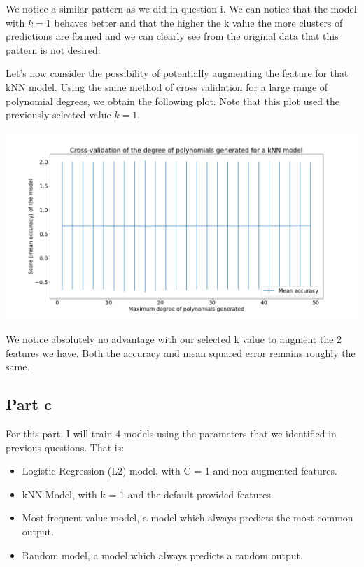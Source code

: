 \documentclass[10pt]{article}
\begin{document}
We notice a similar pattern as we did in question i.
We can notice that the model with $ k = 1 $ behaves better and that the
higher the k value the more clusters of predictions are formed and we can clearly
see from the original data that this pattern is not desired.
\par
Let's now consider the possibility of potentially augmenting the feature for that kNN model.
Using the same method of cross validation for a large range of polynomial degrees, we obtain the following plot.
Note that this plot used the previously selected value $ k = 1 $.

\begin{center}
    \includegraphics[scale=0.25]{ds_2_knn_d_cv.png}
\end{center}
\vspace{5mm} %
We notice absolutely no advantage with our selected k value to augment the 2 features we have.
Both the accuracy and mean squared error remains roughly the same.

\subsection*{Part c}
For this part, I will train 4 models using the parameters that we identified in previous questions.
That is:
\begin{itemize}
    \item Logistic Regression (L2) model, with C = 1 and non augmented features.
    \item kNN Model, with k = 1 and the default provided features.
    \item Most frequent value model, a model which always predicts the most common output.
    \item Random model, a model which always predicts a random output.
  \end{itemize}
\end{document}

